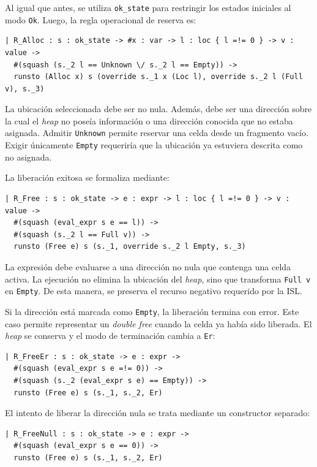 \documentclass[a4paper,	11pt]{report}
\begin{document}
Al igual que antes,
se utiliza \lstinline|ok_state| para restringir los estados iniciales al modo \lstinline|Ok|.
Luego,
la regla operacional de reserva es:

\begin{lstlisting}
| R_Alloc : s : ok_state -> #x : var -> l : loc { l =!= 0 } -> v : value ->
  #(squash (s._2 l == Unknown \/ s._2 l == Empty)) ->
  runsto (Alloc x) s (override s._1 x (Loc l), override s._2 l (Full v), s._3)
\end{lstlisting}
La ubicación seleccionada debe ser no nula.
Además,
debe ser una dirección sobre la cual el \emph{heap} no poseía información o una dirección conocida que no estaba asignada.
Admitir \lstinline|Unknown| permite reservar una celda desde un fragmento vacío.
Exigir únicamente \lstinline|Empty| requeriría que la ubicación ya estuviera descrita como no asignada.

La liberación exitosa se formaliza mediante:

\begin{lstlisting}
| R_Free : s : ok_state -> e : expr -> l : loc { l =!= 0 } -> v : value ->
  #(squash (eval_expr s e == l)) ->
  #(squash (s._2 l == Full v)) ->
  runsto (Free e) s (s._1, override s._2 l Empty, s._3)
\end{lstlisting}
La expresión debe evaluarse a una dirección no nula que contenga una celda activa.
La ejecución no elimina la ubicación del \emph{heap},
sino que transforma \lstinline|Full v| en \lstinline|Empty|.
De esta manera,
se preserva el recurso negativo requerido por la ISL.

Si la dirección
está marcada como \lstinline|Empty|,
la liberación termina con error.
Este caso permite representar un \emph{double free} cuando la celda ya había sido liberada.
El \emph{heap} se conserva y el modo de terminación cambia a \texttt{Er}:

\begin{lstlisting}
| R_FreeEr : s : ok_state -> e : expr ->
  #(squash (eval_expr s e =!= 0)) ->
  #(squash (s._2 (eval_expr s e) == Empty)) ->
  runsto (Free e) s (s._1, s._2, Er)
\end{lstlisting}

El intento de liberar la dirección nula se trata mediante un constructor separado:

\begin{lstlisting}
| R_FreeNull : s : ok_state -> e : expr ->
  #(squash (eval_expr s e == 0)) ->
  runsto (Free e) s (s._1, s._2, Er)
\end{lstlisting}
\end{document}
